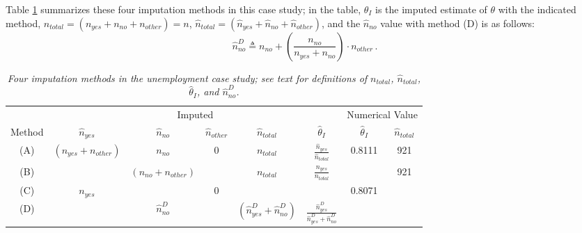 \documentclass[12pt]{article}
\begin{document}
\begin{itemize}
\begin{itemize}
\end{itemize}

Table \ref{t:imputation-1} summarizes these four imputation methods in this case study; in the table, $\hat{ \theta }_I$ is the imputed estimate of $\theta$ with the indicated method, $n_{ total } = ( n_{ yes } + n_{ no } + n_{ other } ) = n$, $\hat{ n }_{ total } = ( \hat{ n }_{ yes } + \hat{ n }_{ no } + \hat{ n }_{ other } )$, and the $\hat{ n }_{ no }$ value with method (D) is as follows:
\begin{equation} \label{e:proportional-1}
\hat{ n }_{ no }^D \triangleq n_{ no } + \left( \frac{ n_{ no } }{ n_{ yes } + n_{ no } } \right) \cdot n_{ other } \, .
\end{equation}

\begin{table}[t!]

\centering

\caption{\textit{Four imputation methods in the unemployment case study; see text for definitions of $n_{ total }$, $\hat{ n }_{ total }$, $\hat{ \theta }_I$, and $\hat{ n }_{ no }^D$.}}

\label{t:imputation-1}

\bigskip

\begin{tabular}{c||ccccc||cc}

& \multicolumn{5}{c||}{Imputed} & \multicolumn{2}{c}{Numerical Value} \\ \cline{2-8}

\rule{0pt}{3ex} Method & $\hat{ n }_{ yes }$ & $\hat{ n }_{ no }$ & $\hat{ n }_{ other }$ & $\hat{ n }_{ total }$ & $\hat{ \theta }_I$ & $\hat{ \theta }_I$ & $\hat{ n }_{ total }$ \\ \hline 

\rule{0pt}{3ex} (A) & $( n_{ yes } + n_{ other } )$ & $n_{ no }$ & 0 & $n_{ total }$ & $\frac{\hat{n}_{yes}}{\hat{n}_{total}}$& 0.8111 & 921 \\

\rule{0pt}{3ex} (B) & & $( n_{ no } + n_{ other } )$ & & $n_{ total }$ & $\frac{ n_{ yes } }{ n_{ total } }$ & & 921 \\

\rule{0pt}{3ex} (C) & $n_{ yes }$ & & 0 & & & 0.8071 & \\

\rule{0pt}{3ex} (D) & & $\hat{ n }_{ no }^D$ & & $( \hat{ n }_{ yes }^D + \hat{ n }_{ no }^D )$ & $\frac{ \hat{ n }_{ yes }^D }{ \hat{ n }_{ yes }^D + \hat{ n }_{ no }^D }$ &


\end{tabular}
\end{table}
\end{itemize}
\end{document}
